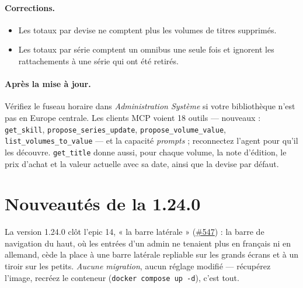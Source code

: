 \paragraph{Corrections.}
\begin{itemize}
  \item Les totaux par devise ne comptent plus les volumes de titres
        supprimés.
  \item Les totaux par série comptent un omnibus une seule fois et
        ignorent les rattachements à une série qui ont été retirés.
\end{itemize}

\paragraph{Après la mise à jour.} Vérifiez le fuseau horaire dans
\emph{Administration \textrightarrow{} Système} si votre bibliothèque
n'est pas en Europe centrale. Les clients MCP voient 18 outils ---
nouveaux : \texttt{get\_skill}, \texttt{propose\_series\_update},
\texttt{propose\_volume\_value}, \texttt{list\_volumes\_to\_value} ---
et la capacité \emph{prompts} ; reconnectez l'agent pour qu'il les
découvre. \texttt{get\_title} donne aussi, pour chaque volume, la note
d'édition, le prix d'achat et la valeur actuelle avec sa date, ainsi
que la devise par défaut.

\section{Nouveautés de la 1.24.0}\label{sec:whats-new-1.24.0}

La version 1.24.0 clôt l'epic 14, « la barre latérale »
(\href{https://github.com/guycorbaz/mybibli/issues/547}{\#547}) : la
barre de navigation du haut, où les entrées d'un admin ne tenaient plus
en français ni en allemand, cède la place à une barre latérale
repliable sur les grands écrans et à un tiroir sur les petits.
\emph{Aucune migration}, aucun réglage modifié --- récupérez l'image,
recréez le conteneur (\texttt{docker compose up -d}), c'est tout.


